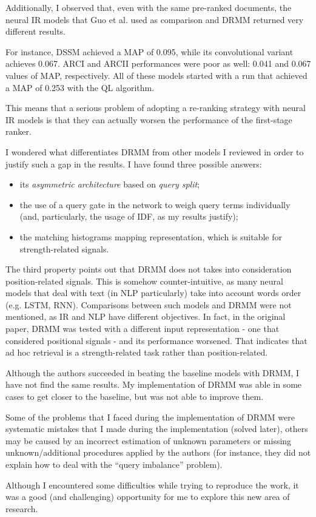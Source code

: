 Additionally, I observed that, even with the same pre-ranked documents, the neural IR models that Guo et al. used as comparison and DRMM returned very different results.

For instance, DSSM achieved a MAP of 0.095, while its convolutional variant achieves 0.067. ARCI and ARCII performances were poor as well: 0.041 and 0.067 values of MAP, respectively. All of these models started with a run that achieved a MAP of 0.253 with the QL algorithm.

This means that a serious problem of adopting a re-ranking strategy with neural IR models is that they can actually worsen the performance of the first-stage ranker.

I wondered what differentiates DRMM from other models I reviewed in order to justify such a gap in the results. I have found three possible answers:

\begin{itemize}
    \item its \textit{asymmetric architecture} based on \textit{query split};
    \item the use of a query gate in the network to weigh query terms individually (and, particularly, the usage of IDF, as my results justify);
    \item the matching histograms mapping representation, which is suitable for strength-related signals.
\end{itemize}

The third property points out that DRMM does not takes into consideration position-related signals. This is somehow counter-intuitive, as many neural models that deal with text (in NLP particularly) take into account words order (e.g. LSTM, RNN). Comparisons between such models and DRMM were not mentioned, as IR and NLP have different objectives. In fact, in the original paper, DRMM was tested with a different input representation - one that considered positional signals - and its performance worsened. That indicates that ad hoc retrieval is a strength-related task rather than position-related.

Although the authors succeeded in beating the baseline models with DRMM, I have not find the same results. My implementation of DRMM was able in some cases to get closer to the baseline, but was not able to improve them.

Some of the problems that I faced during the implementation of DRMM were systematic mistakes that I made during the implementation (solved later), others may be caused by an incorrect estimation of unknown parameters or missing unknown/additional procedures applied by the authors (for instance, they did not explain how to deal with the ``query imbalance'' problem).

Although I encountered some difficulties while trying to reproduce the work, it was a good (and challenging) opportunity for me to explore this new area of research.
